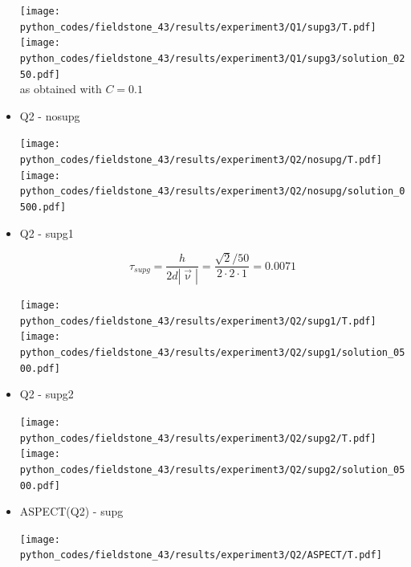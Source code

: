 \begin{itemize}
\begin{center}
\texttt{[image: python\_codes/fieldstone\_43/results/experiment3/Q1/supg3/T.pdf]}
\texttt{[image: python\_codes/fieldstone\_43/results/experiment3/Q1/supg3/solution\_0250.pdf]}\\
as obtained with $C=0.1$
\end{center}


\item Q2 - nosupg %

\begin{center}
\texttt{[image: python\_codes/fieldstone\_43/results/experiment3/Q2/nosupg/T.pdf]}
\texttt{[image: python\_codes/fieldstone\_43/results/experiment3/Q2/nosupg/solution\_0500.pdf]}
\end{center}

\item Q2 - supg1 %

\[
\tau_{supg} = \frac{h}{2 d |\vec{\upnu}|} = \frac{\sqrt{2}/50}{2 \cdot 2 \cdot 1} = 0.0071
\]

\begin{center}
\texttt{[image: python\_codes/fieldstone\_43/results/experiment3/Q2/supg1/T.pdf]}
\texttt{[image: python\_codes/fieldstone\_43/results/experiment3/Q2/supg1/solution\_0500.pdf]}
\end{center}

\item Q2 - supg2 %

\begin{center}
\texttt{[image: python\_codes/fieldstone\_43/results/experiment3/Q2/supg2/T.pdf]}
\texttt{[image: python\_codes/fieldstone\_43/results/experiment3/Q2/supg2/solution\_0500.pdf]}
\end{center}

\item ASPECT(Q2) - supg %

\begin{center}
\texttt{[image: python\_codes/fieldstone\_43/results/experiment3/Q2/ASPECT/T.pdf]}
\end{center}




\end{itemize}

